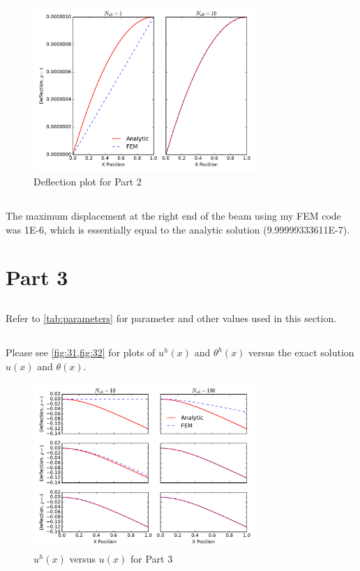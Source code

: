 \documentclass{article}
\begin{document}
\begin{figure}[ht]
	\centering
	\includegraphics[width=0.75\textwidth]{beam1_deflection_prob2_dof2}
	\caption{Deflection plot for Part 2}
	\label{fig:part2}
\end{figure}

\subsection{}
The maximum displacement at the right end of the beam using my FEM code was 1E-6, which is essentially equal to the analytic solution (9.99999333611E-7).

\section{Part 3}

\subsection{}
Refer to \cref{tab:parameters} for parameter and other values used in this section.

\subsection{}
Please see \cref{fig:31,fig:32} for plots of $u^h(x)$ and $\theta^h(x)$ versus the exact solution $u(x)$ and $\theta(x)$.

\begin{figure}[ht]
	\centering
	\includegraphics[width=0.75\textwidth]{beam1_deflection_prob3_dof0}
	\caption{$u^h(x)$ versus $u(x)$ for Part 3}
	\label{fig:31}
\end{figure}
\end{document}
